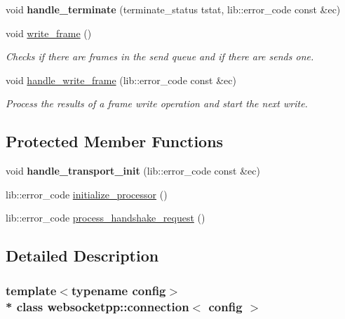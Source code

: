 \begin{DoxyCompactItemize}
\item 
void {\bfseries handle\+\_\+terminate} (terminate\+\_\+status tstat, lib\+::error\+\_\+code const \&ec)\hypertarget{classwebsocketpp_1_1connection_a5012a184129c08ea3f6cfa377e1770c1}{}\label{classwebsocketpp_1_1connection_a5012a184129c08ea3f6cfa377e1770c1}

\item 
void \hyperlink{classwebsocketpp_1_1connection_a8d26a29e90d4847f3882c280112c6b60}{write\+\_\+frame} ()
\begin{DoxyCompactList}\small\item\em Checks if there are frames in the send queue and if there are sends one. \end{DoxyCompactList}\item 
void \hyperlink{classwebsocketpp_1_1connection_a867f94b82788e978ea116d50cf83d72e}{handle\+\_\+write\+\_\+frame} (lib\+::error\+\_\+code const \&ec)
\begin{DoxyCompactList}\small\item\em Process the results of a frame write operation and start the next write. \end{DoxyCompactList}\end{DoxyCompactItemize}
\subsection*{Protected Member Functions}
\begin{DoxyCompactItemize}
\item 
void {\bfseries handle\+\_\+transport\+\_\+init} (lib\+::error\+\_\+code const \&ec)\hypertarget{classwebsocketpp_1_1connection_ad42c5982a35b82c9009971722943b1e0}{}\label{classwebsocketpp_1_1connection_ad42c5982a35b82c9009971722943b1e0}

\item 
lib\+::error\+\_\+code \hyperlink{classwebsocketpp_1_1connection_ac1c576bd4dfebac977eade9ac637a432}{initialize\+\_\+processor} ()
\item 
lib\+::error\+\_\+code \hyperlink{classwebsocketpp_1_1connection_a569483c7dcf542f500f6e9f49d803010}{process\+\_\+handshake\+\_\+request} ()
\end{DoxyCompactItemize}


\subsection{Detailed Description}
\subsubsection*{template$<$typename config$>$\\*
class websocketpp\+::connection$<$ config $>$}

